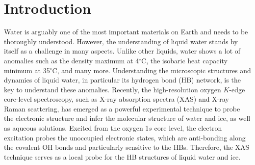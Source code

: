 \documentclass[prb,twocolumn,showpacs,preprintnumbers,superscriptaddress,amsmath,amssymb]{revtex4}
\begin{document}
\maketitle

\section{Introduction}
Water is arguably one of the most important materials on Earth and needs to be thoroughly understood.\cite{ball2008water}
However, the understanding of liquid water stands by itself as a challenge in many aspects.
Unlike other liquids, water shows a lot of anomalies such as the density maximum at 4$^{\circ}$C,
the isobaric heat capacity minimum at 35$^{\circ}$C, and many more.\cite{gallo2016water,sun2014liquid}
Understanding the microscopic structures and dynamics of liquid water, in particular its hydrogen bond (HB) network,
is the key to understand these anomalies.\cite{palmer2014metastable,nilsson2011perspective,nilsson2010JESRP,13L-Swartz}
Recently, the high-resolution oxygen $K$-edge core-level spectroscopy, such as X-ray
absorption spectra (XAS) and X-ray Raman scattering,
has emerged as a powerful experimental technique
to probe the electronic structure and infer the molecular structure of water and ice, as well as aqueous solutions.
\cite{Wernet995,chen2010PRLxas,kong2012PRB,tse2008PRL,head2006tetrahedral,smith2006probing,nordlund2009sensitivity,vinson2012theoretical,
fuchs2008isotope,giulia2006PRLxas,nilsson2010JESRP,nilsson2010x,fransson2016requirements,sellberg2014comparison,schreck2016isotope,nagasaka2017reliable}
Excited from the oxygen 1$s$ core level, the electron excitation probes the unoccupied electronic states,
which are anti-bonding along the covalent OH bonds and particularly sensitive to the HBs.
Therefore, the XAS technique serves as a local probe for the HB structures of liquid water and ice.
\end{document}
